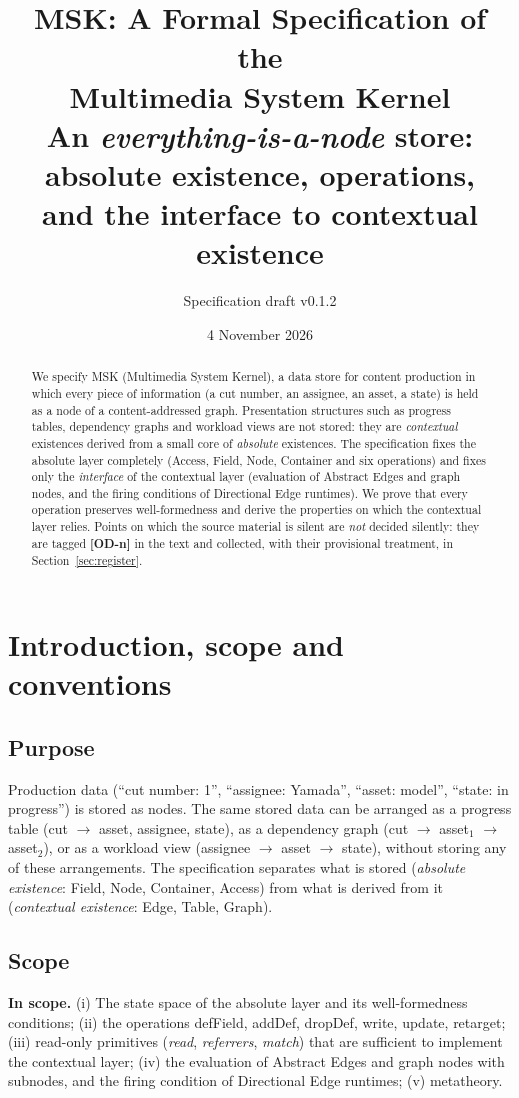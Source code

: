 \documentclass[11pt,a4paper]{article}
\title{\textbf{MSK: A Formal Specification of the\\ Multimedia System Kernel}\\[4pt]
\large An \emph{everything-is-a-node} store: absolute existence, operations,\\ and the interface to contextual existence}
\author{Specification draft v0.1.2}
\date{4 November 2026}
\theoremstyle{definition}
\theoremstyle{plain}
\theoremstyle{remark}
\newcommand{\od}[1]{\textsf{\textbf{\textcolor{BrickRed}{[OD-#1]}}}}
\begin{document}
\maketitle

\begin{abstract}
We specify MSK (Multimedia System Kernel), a data store for content production in which every piece of information
(a cut number, an assignee, an asset, a state) is held as a node of a content-addressed graph.
Presentation structures such as progress tables, dependency graphs and workload views are not stored:
they are \emph{contextual} existences derived from a small core of \emph{absolute} existences.
The specification fixes the absolute layer completely (Access, Field, Node, Container and six operations)
and fixes only the \emph{interface} of the contextual layer (evaluation of Abstract Edges and graph nodes,
and the firing conditions of Directional Edge runtimes).
We prove that every operation preserves well-formedness and derive the properties on which the contextual layer relies.
Points on which the source material is silent are \emph{not} decided silently:
they are tagged \od{n} in the text and collected, with their provisional treatment, in Section~\ref{sec:register}.
\end{abstract}

\tableofcontents
\newpage

\section{Introduction, scope and conventions}
\label{sec:intro}

\subsection{Purpose}
Production data (``cut number: 1'', ``assignee: Yamada'', ``asset: model'', ``state: in progress'')
is stored as nodes. The same stored data can be arranged as a progress table
(cut $\to$ asset, assignee, state), as a dependency graph (cut $\to$ asset$_1$ $\to$ asset$_2$),
or as a workload view (assignee $\to$ asset $\to$ state), without storing any of these arrangements.
The specification separates what is stored (\emph{absolute existence}: Field, Node, Container, Access)
from what is derived from it (\emph{contextual existence}: Edge, Table, Graph).

\subsection{Scope}
\textbf{In scope.} (i) The state space of the absolute layer and its well-formedness conditions;
(ii) the operations \textsf{defField}, \textsf{addDef}, \textsf{dropDef}, \textsf{write}, \textsf{update}, \textsf{retarget};
(iii) read-only primitives (\emph{read}, \emph{referrers}, \emph{match}) that are sufficient to implement the contextual layer;
(iv) the evaluation of Abstract Edges and graph nodes with subnodes, and the firing condition of Directional Edge runtimes;
(v) metatheory.
\end{document}
